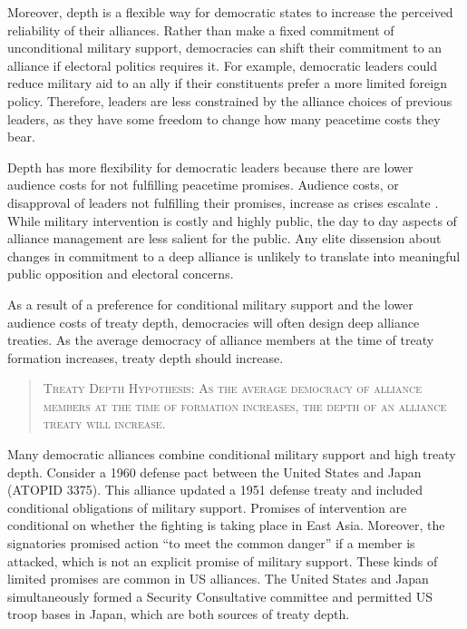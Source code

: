 \documentclass[12pt]{article}
\begin{document}
Moreover, depth is a flexible way for democratic states to increase the perceived reliability of their alliances. 
Rather than make a fixed commitment of unconditional military support, democracies can shift their commitment to an alliance if electoral politics requires it.
For example, democratic leaders could reduce military aid to an ally if their constituents prefer a more limited foreign policy.  
Therefore, leaders are less constrained by the alliance choices of previous leaders, as they have some freedom to change how many peacetime costs they bear. 


Depth has more flexibility for democratic leaders because there are lower audience costs for not fulfilling peacetime promises. 
Audience costs, or disapproval of leaders not fulfilling their promises, increase as crises escalate \citep{Tomz2007}. 
While military intervention is costly and highly public, the day to day aspects of alliance management are less salient for the public. 
Any elite dissension about changes in commitment to a deep alliance is unlikely to translate into meaningful public opposition and electoral concerns. 


As a result of a preference for conditional military support and the lower audience costs of treaty depth, democracies will often design deep alliance treaties. 
As the average democracy of alliance members at the time of treaty formation increases, treaty depth should increase. 


\begin{quote}
\textsc{Treaty Depth Hypothesis: As the average democracy of alliance members at the time of formation increases, the depth of an alliance treaty will increase.}
\end{quote} 


Many democratic alliances combine conditional military support and high treaty depth. 
Consider a 1960 defense pact between the United States and Japan (ATOPID 3375).
This alliance updated a 1951 defense treaty and included conditional obligations of military support. 
Promises of intervention are conditional on whether the fighting is taking place in East Asia. 
Moreover, the signatories promised action ``to meet the common danger'' if a member is attacked, which is not an explicit promise of military support. 
These kinds of limited promises are common in US alliances. 
The United States and Japan simultaneously formed a Security Consultative committee and permitted US troop bases in Japan, which are both sources of treaty depth. 
\end{document}
